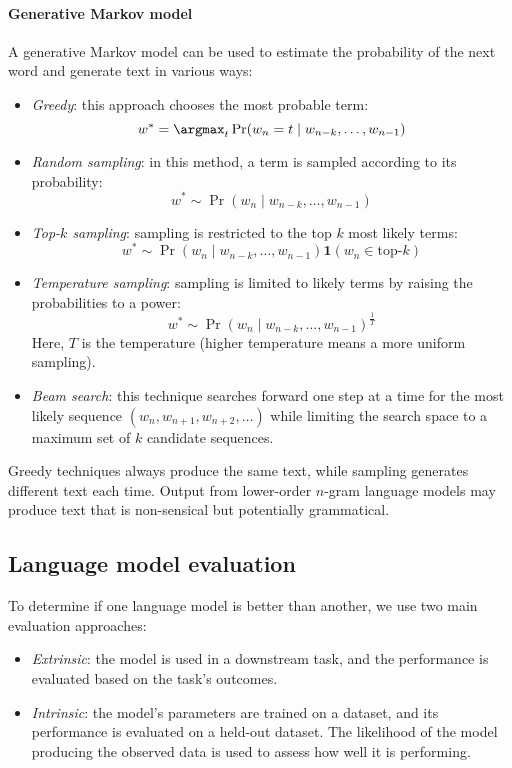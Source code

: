 \paragraph*{Generative Markov model}
A generative Markov model can be used to estimate the probability of the next word and generate text in various ways:
\begin{itemize}
    \item \textit{Greedy}: this approach chooses the most probable term:
        \[w^\ast = \argmax_t \Pr(w_n=t \mid w_{n-k} ,\dots,w_{n-1})\]
    \item \textit{Random sampling}: in this method, a term is sampled according to its probability:
        \[w^\ast\sim \Pr(w_n\mid  w_{n-k} ,\dots,w_{n-1})\]
    \item \textit{Top-$k$ sampling}: sampling is restricted to the top $k$ most likely terms:
        \[w^\ast\sim\Pr(w_n\mid w_{n-k} ,\dots,w_{n-1})\mathbf{1}(w_n \in \text{top-}k)\]
    \item \textit{Temperature sampling}: sampling is limited to likely terms by raising the probabilities to a power:
        \[w^\ast\sim \Pr(w_n\mid w_{n-k} ,\dots,w_{n-1})^{\frac{1}{T}}\]
        Here, $T$ is the temperature (higher temperature means a more uniform sampling).
    \item \textit{Beam search}: this technique searches forward one step at a time for the most likely sequence $(w_n, w_{n+1}, w_{n+2}, \dots)$ while limiting the search space to a maximum set of $k$ candidate sequences.
\end{itemize}
\noindent Greedy techniques always produce the same text, while sampling generates different text each time. 
Output from lower-order $n$-gram language models may produce text that is non-sensical but potentially grammatical.

\subsection{Language model evaluation}
To determine if one language model is better than another, we use two main evaluation approaches:
\begin{itemize}
    \item \textit{Extrinsic}: the model is used in a downstream task, and the performance is evaluated based on the task's outcomes.
    \item \textit{Intrinsic}: the model's parameters are trained on a dataset, and its performance is evaluated on a held-out dataset. 
        The likelihood of the model producing the observed data is used to assess how well it is performing.
\end{itemize}

